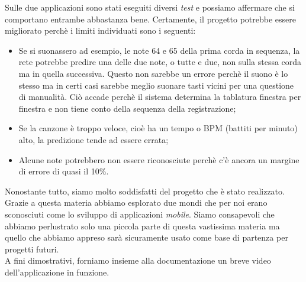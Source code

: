 Sulle due applicazioni sono stati eseguiti diversi \textit{test} e possiamo affermare che si comportano entrambe abbastanza bene. Certamente, il progetto potrebbe essere migliorato perchè i limiti individuati sono i seguenti:
\begin{itemize}
		\item Se si suonassero ad esempio, le note 64 e 65 della prima corda in sequenza, la rete potrebbe predire una delle due note, o tutte e due, non sulla stessa corda ma in quella successiva. Questo non sarebbe un errore perchè il suono è lo stesso ma in certi casi sarebbe meglio suonare tasti vicini per una questione di manualità. Ciò accade perchè il sistema determina la tablatura finestra per finestra e non tiene conto della sequenza della registrazione;
		\item Se la canzone è troppo veloce, cioè ha un tempo o BPM (battiti per minuto) alto, la predizione tende ad essere errata;
		\item Alcune note potrebbero non essere riconosciute perchè c'è ancora un margine di errore di quasi il 10\%.
	\end{itemize}
Nonostante tutto, siamo molto soddisfatti del progetto che è stato realizzato. Grazie a questa materia abbiamo esplorato due mondi che per noi erano sconosciuti come lo sviluppo di applicazioni \textit{mobile}. Siamo consapevoli che abbiamo perlustrato solo una piccola parte di questa vastissima materia ma quello che abbiamo appreso sarà sicuramente usato come base di partenza per progetti futuri.\\
\newline
A fini dimostrativi, forniamo insieme alla documentazione un breve video dell'applicazione in funzione.